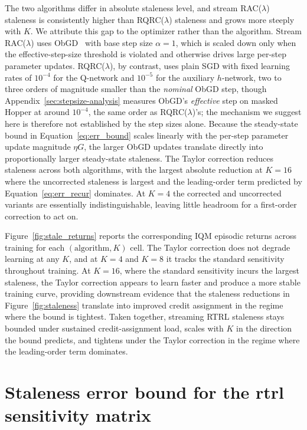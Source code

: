 \documentclass{article}
\begin{document}
The two algorithms differ in absolute staleness level, and stream RAC($\lambda$)
staleness is consistently higher than RQRC($\lambda$) staleness and grows more
steeply with $K$. We attribute this gap to the optimizer rather than the
algorithm. Stream RAC($\lambda$) uses ObGD~\citep{elsayed2024streaming} with
base step size $\alpha=1$, which is scaled down only when the
effective-step-size threshold is violated and otherwise drives large per-step
parameter updates. RQRC($\lambda$), by contrast, uses plain SGD with fixed
learning rates of $10^{-4}$ for the Q-network and $10^{-5}$ for the auxiliary
$h$-network, two to three orders of magnitude smaller than the \emph{nominal} ObGD step, though
Appendix~\ref{sec:stepsize-analysis} measures ObGD's \emph{effective} step on masked Hopper at
around $10^{-4}$, the same order as RQRC($\lambda$)'s; the mechanism we suggest here is
therefore not established by the step sizes alone. Because the steady-state bound in Equation~\eqref{eq:err_bound} scales
linearly with the per-step parameter update magnitude $\eta G$, the larger
ObGD updates translate directly into proportionally larger steady-state
staleness. The Taylor correction reduces staleness across both algorithms,
with the largest absolute reduction at $K{=}16$ where the uncorrected
staleness is largest and the leading-order term predicted by
Equation~\eqref{eq:err_recur} dominates. At $K{=}4$ the corrected and
uncorrected variants are essentially indistinguishable, leaving little
headroom for a first-order correction to act on.

Figure~\ref{fig:stale_returns} reports the corresponding IQM episodic returns
across training for each $(\text{algorithm}, K)$ cell. The Taylor correction
does not degrade learning at any $K$, and at $K{=}4$ and $K{=}8$ it tracks the
standard sensitivity throughout training. At $K{=}16$, where the standard
sensitivity incurs the largest staleness, the Taylor correction appears to
learn faster and produce a more stable training curve, providing downstream
evidence that the staleness reductions in Figure~\ref{fig:staleness} translate
into improved credit assignment in the regime where the bound is tightest.
Taken together, streaming RTRL staleness stays bounded under sustained
credit-assignment load, scales with $K$ in the direction the bound predicts,
and tightens under the Taylor correction in the regime where the leading-order
term dominates.

\section{Staleness error bound for the \gls{rtrl} sensitivity matrix}
\label{sec:staleness-proof}
\end{document}
